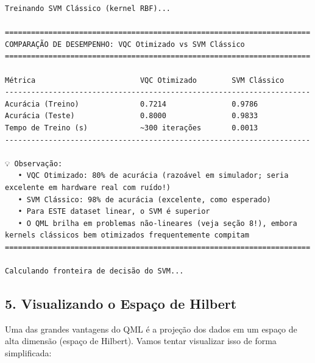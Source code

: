 \documentclass[
  brazilian,
]{report}
\begin{document}
\begin{verbatim}
Treinando SVM Clássico (kernel RBF)...

======================================================================
COMPARAÇÃO DE DESEMPENHO: VQC Otimizado vs SVM Clássico
======================================================================

Métrica                        VQC Otimizado        SVM Clássico        
----------------------------------------------------------------------
Acurácia (Treino)              0.7214               0.9786              
Acurácia (Teste)               0.8000               0.9833              
Tempo de Treino (s)            ~300 iterações       0.0013              
----------------------------------------------------------------------

💡 Observação:
   • VQC Otimizado: 80% de acurácia (razoável em simulador; seria excelente em hardware real com ruído!)
   • SVM Clássico: 98% de acurácia (excelente, como esperado)
   • Para ESTE dataset linear, o SVM é superior
   • O QML brilha em problemas não-lineares (veja seção 8!), embora kernels clássicos bem otimizados frequentemente compitam
======================================================================

Calculando fronteira de decisão do SVM...
\end{verbatim}

\subsection{5. Visualizando o Espaço de
Hilbert}\label{visualizando-o-espauxe7o-de-hilbert}

Uma das grandes vantagens do QML é a projeção dos dados em um espaço de
alta dimensão (espaço de Hilbert). Vamos tentar visualizar isso de forma
simplificada:
\end{document}
